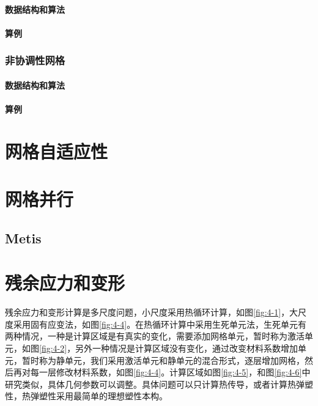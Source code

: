 \subsubsection{数据结构和算法}

\subsubsection{算例}

\subsection{非协调性网格}

\subsubsection{数据结构和算法}

\subsubsection{算例}

\chapter{网格自适应性}

\chapter{网格并行}

\section{Metis}

\chapter{残余应力和变形}

残余应力和变形计算是多尺度问题，小尺度采用热循环计算，如图\ref{fig:4-1}，大尺度采用固有应变法，如图\ref{fig:4-4}。在热循环计算中采用生死单元法，生死单元有两种情况，一种是计算区域是有真实的变化，需要添加网格单元，暂时称为激活单元，如图\ref{fig:4-2}，另外一种情况是计算区域没有变化，通过改变材料系数增加单元，暂时称为静单元，我们采用激活单元和静单元的混合形式，逐层增加网格，然后再对每一层修改材料系数，如图\ref{fig:4-4}。计算区域如图\ref{fig:4-5}，和图\ref{fig:4-6}中研究类似，具体几何参数可以调整。具体问题可以只计算热传导，或者计算热弹塑性，热弹塑性采用最简单的理想塑性本构。


